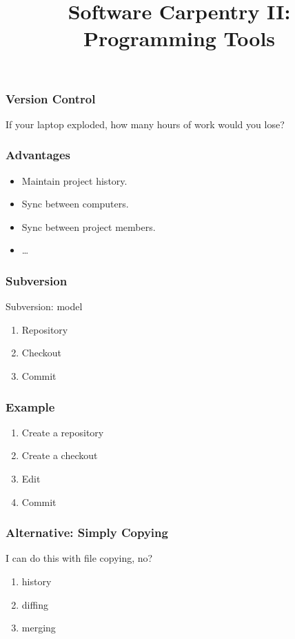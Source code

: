 
\title{Software Carpentry II: Programming Tools}

\frame{\maketitle}

\begin{frame}[fragile]
\frametitle{Version Control}

If your laptop exploded, how many hours of work would you lose?
\end{frame}

\begin{frame}[fragile]
\frametitle{Advantages}
\begin{itemize}
\item Maintain project history.
\item Sync between computers.
\item Sync between project members.
\item \ldots
\end{itemize}
\end{frame}

\begin{frame}[fragile]
\frametitle{Subversion}
\begin{block}{Subversion: model}
\begin{enumerate}
\item Repository
\item Checkout
\item Commit
\end{enumerate}
\end{block}
\end{frame}

\begin{frame}[fragile]
\frametitle{Example}
\begin{enumerate}
\item Create a repository
\item Create a checkout
\item Edit
\item Commit
\end{enumerate}
\end{frame}

\begin{frame}[fragile]
\frametitle{Alternative: Simply Copying}

I can do this with file copying, no?

\pause

\begin{enumerate}
\item history
\item diffing
\item merging
\end{enumerate}
\end{frame}


